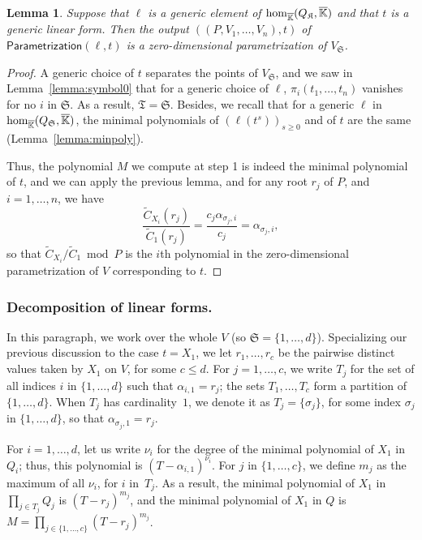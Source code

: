 \documentclass[12pt]{article}
\def\Kbar {{\ensuremath{\overline{\mathbb{K}}}}}
\newtheorem{Lemma}{Lemma}
\begin{document}
\begin{Lemma}
  Suppose that $\ell$ is a generic element of ${\rm
    hom}_{\Kbar}(Q_\mathfrak{K},\Kbar)$ and that $t$ is a generic
  linear form. Then the output $((P,V_1,\dots,V_n),t)$ of
  $\mathsf{Parametrization}(\ell,t)$ is a zero-dimensional
  parametrization of $V_{\mathfrak{S}}$.
\end{Lemma}
\begin{proof}
  A generic choice of $t$ separates the points of $V_{\mathfrak{S}}$,
  and we saw in Lemma~\ref{lemma:symbol0} that for a generic choice of
  $\ell$, $\pi_i(t_1,\dots,t_n)$ vanishes for no $i$ in
  $\mathfrak{S}$.  As a result, $\mathfrak{T}=\mathfrak{S}$.  Besides,
  we recall that for a generic $\ell$ in ${\rm
    hom}_{\Kbar}(Q_\mathfrak{S},\Kbar)$, the minimal polynomials of
  $(\ell(t^s))_{s \ge 0}$ and of $t$ are the same
  (Lemma~\ref{lemma:minpoly}).

  Thus, the polynomial $M$ we compute at step 1 is indeed the minimal
  polynomial of $t$, and we can apply the previous lemma, and for 
  any root $r_j$ of $P$, and $i=1,\dots,n$, we have
  $$\frac{\tilde C_{X_i}(r_j)}{\tilde C_1(r_j)}  = \frac{c_j \alpha_{\sigma_j,i}}{c_j} = \alpha_{\sigma_j,i},$$
  so that $\tilde C_{X_i}/\tilde C_1 \bmod P$ is the $i$th polynomial in
  the zero-dimensional parametrization of $V$ corresponding to $t$.
\end{proof}

\subsubsection{Decomposition of linear forms.}

In this paragraph, we work over the whole $V$ (so
$\mathfrak{S}=\{1,\dots,d\}$).  Specializing our previous discussion
to the case $t=X_1$, we let $r_1,\dots,r_c$ be the pairwise distinct
values taken by $X_1$ on $V$, for some $c \le d$.  For
$j=1,\dots,c$, we write $T_j$ for the set of all indices $i$ in
$\{1,\dots,d\}$ such that $\alpha_{i,1}=r_j$; the sets $T_1,\dots,T_c$
form a partition of $\{1,\dots,d\}$. When $T_j$ has cardinality~$1$,
we denote it as $T_j=\{\sigma_j\}$, for some index $\sigma_j$ in
$\{1,\dots,d\}$, so that $\alpha_{\sigma_j,1}=r_j$.

For $i=1,\dots,d$, let us write $\nu_i$ for the degree of the minimal
polynomial of $X_1$ in $Q_i$; thus, this polynomial is
$(T-\alpha_{i,1})^{\nu_i}$. For $j$ in $\{1,\dots,c\}$, we define
$m_j$ as the maximum of all $\nu_i$, for $i$ in~$T_j$. As a result, the minimal
polynomial of $X_1$ in $\prod_{j \in T_j} Q_j$ is 
$(T-r_j)^{m_j}$, and the minimal polynomial of $X_1$ in $Q$ is
$M=\prod_{j \in \{1,\dots,c\}} (T-r_j)^{m_j}$.
\end{document}

